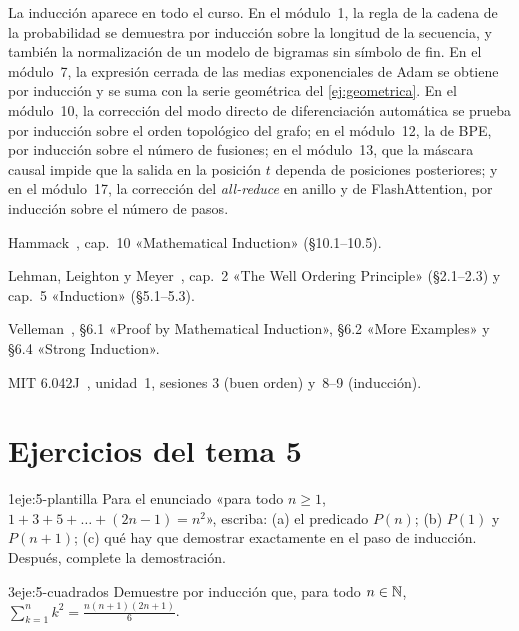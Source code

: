 \begin{observacion}
La inducción aparece en todo el curso. En el módulo~1, la regla de la cadena de la probabilidad se demuestra por inducción sobre la longitud de la secuencia, y también la normalización de un modelo de bigramas sin símbolo de fin. En el módulo~7, la expresión cerrada de las medias exponenciales de Adam se obtiene por inducción y se suma con la serie geométrica del \cref{ej:geometrica}. En el módulo~10, la corrección del modo directo de diferenciación automática se prueba por inducción sobre el orden topológico del grafo; en el módulo~12, la de BPE, por inducción sobre el número de fusiones; en el módulo~13, que la máscara causal impide que la salida en la posición $t$ dependa de posiciones posteriores; y en el módulo~17, la corrección del \emph{all-reduce} en anillo y de FlashAttention, por inducción sobre el número de pasos.
\end{observacion}

\begin{lecturas}
\item Hammack~\cite{hammack}, cap.~10 «Mathematical Induction» (§10.1–10.5).
\item Lehman, Leighton y Meyer~\cite{mcs}, cap.~2 «The Well Ordering Principle» (§2.1–2.3) y cap.~5 «Induction» (§5.1–5.3).
\item Velleman~\cite{velleman}, §6.1 «Proof by Mathematical Induction», §6.2 «More Examples» y §6.4 «Strong Induction».
\item MIT 6.042J~\cite{mit6042}, unidad~1, sesiones 3 (buen orden) y~8–9 (inducción).
\end{lecturas}

\section*{Ejercicios del tema 5}

\begin{ejercicio}{1}{eje:5-plantilla}
Para el enunciado «para todo $n\ge 1$, $1+3+5+\dots+(2n-1)=n^{2}$», escriba: (a) el predicado $P(n)$; (b) $P(1)$ y $P(n+1)$; (c) qué hay que demostrar exactamente en el paso de inducción. Después, complete la demostración.
\end{ejercicio}

\begin{ejercicio}{3}{eje:5-cuadrados}
Demuestre por inducción que, para todo $n\in\mathbb{N}$, $\displaystyle\sum_{k=1}^{n}k^{2}=\frac{n(n+1)(2n+1)}{6}$.
\end{ejercicio}


